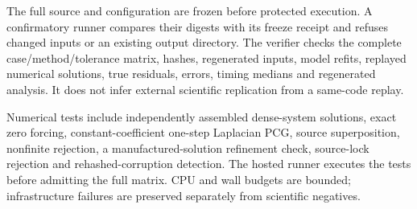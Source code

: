 The full source and configuration are frozen before protected execution. A confirmatory runner compares their digests with its freeze receipt and refuses changed inputs or an existing output directory. The verifier checks the complete case/method/tolerance matrix, hashes, regenerated inputs, model refits, replayed numerical solutions, true residuals, errors, timing medians and regenerated analysis. It does not infer external scientific replication from a same-code replay.

Numerical tests include independently assembled dense-system solutions, exact zero forcing, constant-coefficient one-step Laplacian PCG, source superposition, nonfinite rejection, a manufactured-solution refinement check, source-lock rejection and rehashed-corruption detection. The hosted runner executes the tests before admitting the full matrix. CPU and wall budgets are bounded; infrastructure failures are preserved separately from scientific negatives.
